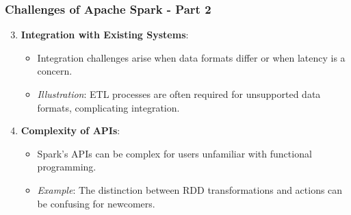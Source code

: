 \documentclass[aspectratio=169]{beamer}
\begin{document}
\begin{frame}[fragile]
    \frametitle{Challenges of Apache Spark - Part 2}
    \begin{enumerate}
        \setcounter{enumi}{2} %
        \item \textbf{Integration with Existing Systems}:
            \begin{itemize}
                \item Integration challenges arise when data formats differ or when latency is a concern.
                \item \textit{Illustration}: ETL processes are often required for unsupported data formats, complicating integration.
            \end{itemize}
        
        \item \textbf{Complexity of APIs}:
            \begin{itemize}
                \item Spark's APIs can be complex for users unfamiliar with functional programming.
                \item \textit{Example}: The distinction between RDD transformations and actions can be confusing for newcomers.
            \end{itemize}
    \end{enumerate}
\end{frame}
\end{document}
